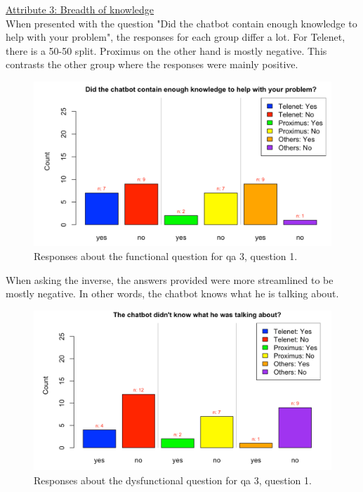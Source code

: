 \break
\ul{Attribute 3: Breadth of knowledge}\\
\break
When presented with the question "Did the chatbot contain enough knowledge to help with your problem", the responses for each group differ a lot. For Telenet, there is a 50-50 split. Proximus on the other hand is mostly negative. This contrasts the other group where the responses were mainly positive.\\
\begin{figure}[!htb]
	\includegraphics[width=\linewidth, scale=0.5]{../LaTeX/Figures/Comparative/Q3.png}
	\caption{Responses about the functional question for \acrshort{qa} 3, question 1.}\label{fig:Q3}
\end{figure}
When asking the inverse, the answers provided were more streamlined to be mostly negative. In other words, the chatbot knows what he is talking about.\\
\begin{figure}[!htb]
	\includegraphics[width=\linewidth, scale=0.5]{../LaTeX/Figures/Comparative/DQ3.png}
	\caption{Responses about the dysfunctional question for \acrshort{qa} 3, question 1.}\label{fig:DQ3}
\end{figure}
